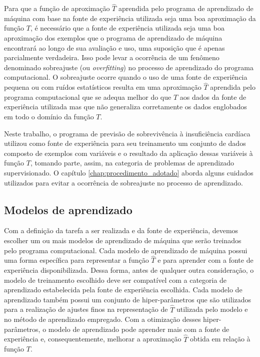 Para que a função de aproximação $\hat{T}$ aprendida pelo programa de aprendizado de máquina com base na fonte de experiência utilizada seja uma boa aproximação da função $T$, é necessário que a fonte de experiência utilizada seja uma boa aproximação dos exemplos que o programa de aprendizado de máquina encontrará ao longo de sua avaliação e uso, uma suposição que é apenas parcialmente verdadeira\cite[p.6]{machine_learning}. Isso pode levar a ocorrência de um fenômeno denominado sobreajuste (ou \textit{overfitting}) no processo de aprendizado do programa computacional. O sobreajuste ocorre quando o uso de uma fonte de experiência pequena ou com ruídos estatísticos resulta em uma aproximação $\hat{T}$ aprendida pelo programa computacional que se adequa melhor do que $T$ aos dados da fonte de experiência utilizada mas que não generaliza corretamente os dados englobados em todo o domínio da função $T$\cite[p.79-80]{machine_learning}.

Neste trabalho, o programa de previsão de sobrevivência à insuficiência cardíaca utilizou como fonte de experiência para seu treinamento um conjunto de dados\cite{larxel_dataset} composto de exemplos com variáveis e o resultado da aplicação dessas variáveis à função $T$, tomando parte, assim, na categoria de problemas de aprendizado supervisionado. O capítulo \ref{chap:procedimento_adotado} aborda alguns cuidados utilizados para evitar a ocorrência de sobreajuste no processo de aprendizado.

\subsection{Modelos de aprendizado}

Com a definição da tarefa a ser realizada e da fonte de experiência, devemos escolher um ou mais modelos de aprendizado de máquina que serão treinados pelo programa computacional. Cada modelo de aprendizado de máquina possui uma forma específica para representar a função $\hat{T}$ e para aprender com a fonte de experiência disponibilizada. Dessa forma, antes de qualquer outra consideração, o modelo de treinamento escolhido deve ser compatível com a categoria de aprendizado estabelecida pela fonte de experiência escolhida. Cada modelo de aprendizado também possui um conjunto de hiper-parâmetros que são utilizados para a realização de ajustes finos na representação de $\hat{T}$ utilizada pelo modelo e no método de aprendizado empregado. Com a otimização desses hiper-parâmetros, o modelo de aprendizado pode aprender mais com a fonte de experiência e, consequentemente, melhorar a aproximação $\hat{T}$ obtida em relação à função $T$.

